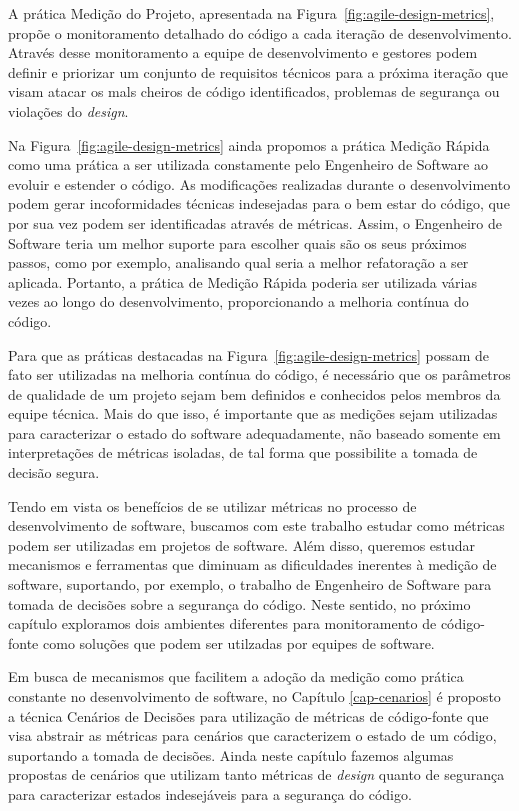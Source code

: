 %

A prática Medição do Projeto, apresentada na Figura~\ref{fig:agile-design-metrics}, propõe o monitoramento detalhado do código a cada iteração de desenvolvimento. Através desse monitoramento a equipe de desenvolvimento e gestores podem definir e priorizar um conjunto de requisitos técnicos para a próxima iteração que visam atacar os mals cheiros de código identificados, problemas de segurança ou violações do \emph{design}.

%

Na Figura~\ref{fig:agile-design-metrics} ainda propomos a prática Medição Rápida como uma prática a ser utilizada constamente pelo Engenheiro de Software ao evoluir e estender o código. As modificações realizadas durante o desenvolvimento podem gerar incoformidades técnicas indesejadas para o bem estar do código, que por sua vez podem ser identificadas através de métricas. Assim, o Engenheiro de Software teria um melhor suporte para escolher quais são os seus próximos passos, como por exemplo, analisando qual seria a melhor refatoração a ser aplicada. Portanto, a prática de Medição Rápida poderia ser utilizada várias vezes ao longo do desenvolvimento, proporcionando a melhoria contínua do código.

%

Para que as práticas destacadas na Figura~\ref{fig:agile-design-metrics} possam de fato ser utilizadas na melhoria contínua do código, é necessário que os parâmetros de qualidade de um projeto sejam bem definidos e conhecidos pelos membros da equipe técnica. Mais do que isso, é importante que as medições sejam utilizadas para caracterizar o estado do software adequadamente, não baseado somente em interpretações de métricas isoladas, de tal forma que possibilite a tomada de decisão segura.

%

Tendo em vista os benefícios de se utilizar métricas no processo de desenvolvimento de software, buscamos com este trabalho estudar como métricas podem ser utilizadas em projetos de software. Além disso, queremos estudar mecanismos e ferramentas que diminuam as dificuldades inerentes à medição de software, suportando, por exemplo, o trabalho de Engenheiro de Software para tomada de decisões sobre a segurança do código. Neste sentido, no próximo capítulo exploramos dois ambientes diferentes para monitoramento de código-fonte como soluções que podem ser utilzadas por equipes de software.

%

Em busca de mecanismos que facilitem a adoção da medição como prática constante no desenvolvimento de software, no Capítulo \ref{cap-cenarios} é proposto a técnica Cenários de Decisões para utilização de métricas de código-fonte que visa abstrair as métricas para cenários que caracterizem o estado de um código, suportando a tomada de decisões. Ainda neste capítulo fazemos algumas propostas de cenários que utilizam tanto métricas de \emph{design} quanto de segurança para caracterizar estados indesejáveis para a segurança do código.

